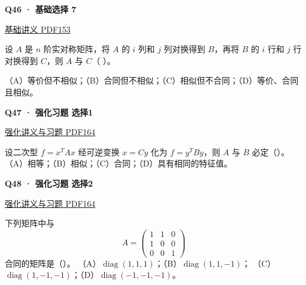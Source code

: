 \documentclass[UTF8,fontset=fandol,11pt,a4paper]{ctexart}
\newcommand{\source}[1]{{\footnotesize\color{Muted}#1\par}}
\newcommand{\qtitle}[2]{\par\needspace{5\baselineskip}\hypertarget{#1}{}\label{#1}\textbf{#2}\par}
\begin{document}
\begin{minipage}{\linewidth}
\qtitle{B-MC-07}{Q46 · 基础选择 7}
\source{\href{file:///Users/skyintelligence/Desktop/\%E5\%BE\%97\%E8\%AF\%BB\%E4\%B8\%AA\%E7\%A0\%94-\%E5\%8C\%97\%E5\%A4\%A7\%E8\%BD\%AF\%E5\%BE\%AE/\%E6\%95\%B0\%E5\%AD\%A6\%20150/\%E8\%AE\%B2\%E4\%B9\%89/\%E3\%80\%90\%E4\%B8\%80\%E9\%AB\%98\%E6\%95\%B0Kira\%E3\%80\%9127\%E8\%80\%83\%E7\%A0\%94\%E7\%BA\%BF\%E4\%BB\%A3\%E5\%9F\%BA\%E7\%A1\%80\%E8\%AE\%B2\%E4\%B9\%89\%26\%E4\%B9\%A0\%E9\%A2\%98-\%E7\%94\%B5\%E5\%AD\%90\%E7\%89\%88.pdf\#page=153}{基础讲义 PDF153}}
设 $A$ 是 $n$ 阶实对称矩阵，将 $A$ 的 $i$ 列和 $j$ 列对换得到 $B$，再将 $B$ 的 $i$ 行和 $j$ 行对换得到 $C$，则 $A$ 与 $C$（ ）。

（A）等价但不相似；（B）合同但不相似；（C）相似但不合同；（D）等价、合同且相似。
\end{minipage}\par\vspace{7mm}
\begin{minipage}{\linewidth}
\qtitle{R-MC-01}{Q47 · 强化习题 选择1}
\source{\href{file:///Users/skyintelligence/Desktop/\%E5\%BE\%97\%E8\%AF\%BB\%E4\%B8\%AA\%E7\%A0\%94-\%E5\%8C\%97\%E5\%A4\%A7\%E8\%BD\%AF\%E5\%BE\%AE/\%E6\%95\%B0\%E5\%AD\%A6\%20150/Kira\%C2\%B727\%E7\%BA\%BF\%E6\%80\%A7\%E4\%BB\%A3\%E6\%95\%B0\%E5\%BC\%BA\%E5\%8C\%96\%E8\%AE\%B2\%E4\%B9\%89\%2B\%E4\%B9\%A0\%E9\%A2\%98.pdf\#page=164}{强化讲义与习题 PDF164}}
设二次型 $f=x^TAx$ 经可逆变换 $x=Cy$ 化为 $f=y^TBy$，则 $A$ 与 $B$ 必定（\quad）。
（A）相等；（B）相似；（C）合同；（D）具有相同的特征值。
\end{minipage}\par\vspace{7mm}
\begin{minipage}{\linewidth}
\qtitle{R-MC-02}{Q48 · 强化习题 选择2}
\source{\href{file:///Users/skyintelligence/Desktop/\%E5\%BE\%97\%E8\%AF\%BB\%E4\%B8\%AA\%E7\%A0\%94-\%E5\%8C\%97\%E5\%A4\%A7\%E8\%BD\%AF\%E5\%BE\%AE/\%E6\%95\%B0\%E5\%AD\%A6\%20150/Kira\%C2\%B727\%E7\%BA\%BF\%E6\%80\%A7\%E4\%BB\%A3\%E6\%95\%B0\%E5\%BC\%BA\%E5\%8C\%96\%E8\%AE\%B2\%E4\%B9\%89\%2B\%E4\%B9\%A0\%E9\%A2\%98.pdf\#page=164}{强化讲义与习题 PDF164}}
下列矩阵中与
\[A=\begin{pmatrix}1&1&0\\1&0&0\\0&0&1\end{pmatrix}\]
合同的矩阵是（\quad）。
（A）$\operatorname{diag}(1,1,1)$；（B）$\operatorname{diag}(1,1,-1)$；
（C）$\operatorname{diag}(1,-1,-1)$；（D）$\operatorname{diag}(-1,-1,-1)$。
\end{minipage}\par\vspace{7mm}
\end{document}
